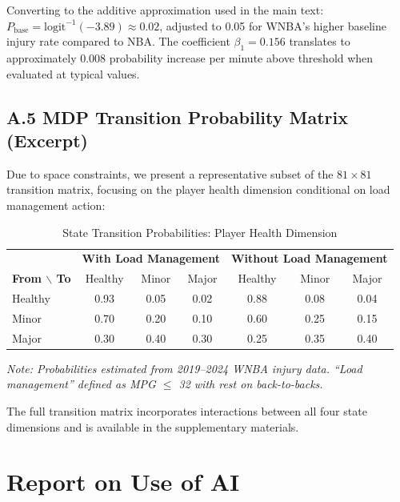\documentclass{mcmthesis}
\begin{document}
Converting to the additive approximation used in the main text: $P_{\text{base}} = \text{logit}^{-1}(-3.89) \approx 0.02$, adjusted to 0.05 for WNBA's higher baseline injury rate compared to NBA. The coefficient $\beta_1 = 0.156$ translates to approximately 0.008 probability increase per minute above threshold when evaluated at typical values.

\subsection*{A.5 MDP Transition Probability Matrix (Excerpt)}

Due to space constraints, we present a representative subset of the $81 \times 81$ transition matrix, focusing on the player health dimension conditional on load management action:

\begin{table}[H]
\centering
\caption{State Transition Probabilities: Player Health Dimension}
\small
\begin{tabular}{l|ccc|ccc}
\toprule
& \multicolumn{3}{c|}{\textbf{With Load Management}} & \multicolumn{3}{c}{\textbf{Without Load Management}} \\
\textbf{From $\backslash$ To} & Healthy & Minor & Major & Healthy & Minor & Major \\
\midrule
Healthy & 0.93 & 0.05 & 0.02 & 0.88 & 0.08 & 0.04 \\
Minor & 0.70 & 0.20 & 0.10 & 0.60 & 0.25 & 0.15 \\
Major & 0.30 & 0.40 & 0.30 & 0.25 & 0.35 & 0.40 \\
\bottomrule
\end{tabular}
\begin{flushleft}
\footnotesize\textit{Note: Probabilities estimated from 2019--2024 WNBA injury data. ``Load management'' defined as MPG $\leq$ 32 with rest on back-to-backs.}
\end{flushleft}
\end{table}

The full transition matrix incorporates interactions between all four state dimensions and is available in the supplementary materials.

\newpage
{}
\setcounter{lastpage}{\value{page}}
\thispagestyle{empty} 

\section*{Report on Use of AI}
\end{document}

